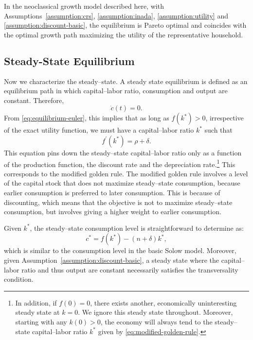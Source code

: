 \documentclass[\topdir/lecture\_notes.tex]{subfiles}
\begin{document}
\begin{proposition}\label{prop:welfare}
  In the neoclassical growth model described here, with Assumptions~\ref{assumption:crs}, \ref{assumption:inada}, \ref{assumption:utility} and \ref{assumption:discount-basic}, the equilibrium is Pareto optimal and coincides with the optimal growth path maximizing the utility of the representative household.
\end{proposition}

\subsection{Steady-State Equilibrium}
Now we characterize the steady--state.
A steady state equilibrium is defined as an equilibrium path in which capital--labor ratio, consumption and output are constant.
Therefore,
\[
  \dot{c}(t)=0.
\]
From \eqref{eq:equilibrium-euler}, this implies that as long as $f\left(k^{*}\right)>0$, irrespective of the exact utility function, we must have a capital--labor ratio $k^{*}$ such that
\begin{equation}
  f^{\prime}\left(k^{*}\right)=\rho+\delta.
  \label{eq:modified-golden-rule}
\end{equation}
This equation pins down the steady--state capital--labor ratio only as a function of the production function, the discount rate and the depreciation rate.\footnote{In addition, if $f(0)=0$, there exists another, economically uninteresting steady state at $k=0$. We ignore this steady state throughout. Moreover, starting with any $k(0)>0$, the economy will always tend to the steady--state capital--labor ratio $k^{*}$ given by \eqref{eq:modified-golden-rule}.} This corresponds to the modified golden rule. The modified golden rule involves a level of the capital stock that does not maximize steady--state consumption, because earlier consumption is preferred to later consumption. This is because of discounting, which means that the objective is not to maximize steady--state consumption, but involves giving a higher weight to earlier consumption.

Given $k^{*}$, the steady--state consumption level is straightforward to determine as:
\begin{equation}
  c^{*}=f\left(k^{*}\right)-(n+\delta) k^{*},
  \label{eq:steady-consumption}
\end{equation}
which is similar to the consumption level in the basic Solow model. Moreover, given Assumption~\ref{assumption:discount-basic}, a steady state where the capital--labor ratio and thus output are constant necessarily satisfies the transversality condition.
\end{document}
